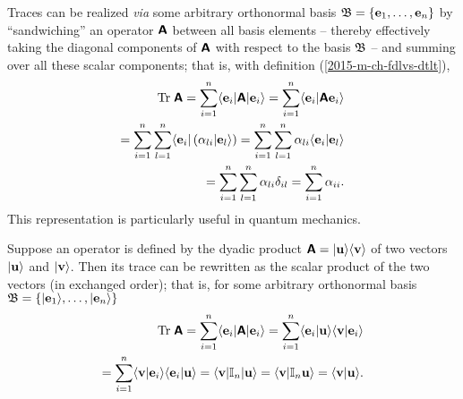 Traces can be realized {\it via} some arbitrary orthonormal basis ${\frak B} =\{
{\bf e}_1,
\ldots ,
{\bf e}_n
\}$
by ``sandwiching'' an operator $\textsf{\textbf{A}}$ between all basis elements -- thereby effectively taking the diagonal components
of    $\textsf{\textbf{A}}$ with respect to the basis ${\frak B}$ --
and summing over all these scalar components; that is, with definition (\ref{2015-m-ch-fdlvs-dtlt}),
\begin{equation}
\begin{split}
\textrm{Tr}\;\textsf{\textbf{A}}
=\sum_{i=1}^n   \langle {\bf e}_i \vert \textsf{\textbf{A}} \vert {\bf e}_i \rangle
=\sum_{i=1}^n   \langle {\bf e}_i \vert \textsf{\textbf{A}}  {\bf e}_i \rangle  \\
=\sum_{i=1}^n  \sum_{l=1}^n  \langle {\bf e}_i \vert \left(\alpha_{li} \vert  {\bf e}_l \rangle \right)
=\sum_{i=1}^n  \sum_{l=1}^n  \alpha_{li} \langle {\bf e}_i \vert  {\bf e}_l \rangle \\
=\sum_{i=1}^n  \sum_{l=1}^n  \alpha_{li} \delta_{il}
=\sum_{i=1}^n   \alpha_{ii}
.
\end{split}
\end{equation}
This representation is particularly useful in quantum mechanics.

Suppose an operator is defined by the dyadic product
$\textsf{\textbf{A}} =  \vert {\bf u} \rangle \langle {\bf v} \rangle
$           of two vectors
$\vert {\bf u} \rangle$
and
$\vert {\bf v} \rangle$.
Then its trace can be rewritten as the scalar product of the two vectors (in exchanged order); that is,
for  some arbitrary orthonormal basis ${\frak B} =\{
 \vert {\bf e}_1\rangle ,
\ldots ,
 \vert {\bf e}_n\rangle
\}$
\begin{equation}
\begin{split}
\textrm{Tr}\;\textsf{\textbf{A}}
=\sum_{i=1}^n   \langle {\bf e}_i \vert \textsf{\textbf{A}} \vert {\bf e}_i \rangle
=\sum_{i=1}^n   \langle {\bf e}_i \vert {\bf u} \rangle \langle {\bf v} \vert   {\bf e}_i \rangle  \\
=\sum_{i=1}^n   \langle {\bf v} \vert   {\bf e}_i \rangle \langle {\bf e}_i \vert {\bf u} \rangle
=   \langle {\bf v} \vert   {\Bbb I}_n \vert {\bf u} \rangle
=   \langle {\bf v} \vert   {\Bbb I}_n  {\bf u} \rangle
=   \langle {\bf v} \vert  {\bf u} \rangle
.
\end{split}
\end{equation}

